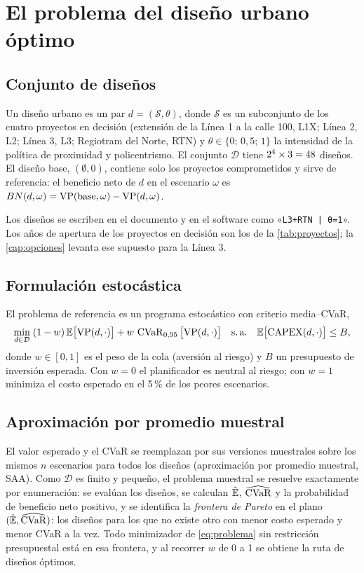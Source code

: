 \chapter{El problema del diseño urbano óptimo}\label{cap:optimizacion}

\section{Conjunto de diseños}

Un diseño urbano es un par $d=(\mathcal S,\theta)$, donde $\mathcal S$ es un subconjunto de los cuatro
proyectos en decisión (extensión de la Línea 1 a la calle 100, L1X; Línea 2, L2; Línea 3, L3;
Regiotram del Norte, RTN) y $\theta\in\{0;\,0{,}5;\,1\}$ la intensidad de la política de proximidad y
policentrismo. El conjunto $\mathcal D$ tiene $2^4\times3=48$ diseños. El diseño base,
$(\emptyset,0)$, contiene solo los proyectos comprometidos y sirve de referencia: el beneficio neto de
$d$ en el escenario $\omega$ es $BN(d,\omega)=\mathrm{VP}(\text{base},\omega)-\mathrm{VP}(d,\omega)$.

Los diseños se escriben en el documento y en el software como «\texttt{L3+RTN | θ=1}». Los años de
apertura de los proyectos en decisión son los de la \cref{tab:proyectos}; la \cref{cap:opciones}
levanta ese supuesto para la Línea 3.

\section{Formulación estocástica}

El problema de referencia es un programa estocástico con criterio media--CVaR,
\begin{equation}\label{eq:problema}
\min_{d\in\mathcal D}\;(1-w)\,\mathbb{E}\big[\mathrm{VP}(d,\cdot)\big]+w\,\operatorname{CVaR}_{0{,}95}\big[\mathrm{VP}(d,\cdot)\big]
\quad\text{s.\,a.}\quad\mathbb{E}\big[\mathrm{CAPEX}(d,\cdot)\big]\le B,
\end{equation}
donde $w\in[0,1]$ es el peso de la cola (aversión al riesgo) y $B$ un presupuesto de inversión
esperada. Con $w=0$ el planificador es neutral al riesgo; con $w=1$ minimiza el costo esperado en el
5\,\% de los peores escenarios.

\section{Aproximación por promedio muestral}

El valor esperado y el CVaR se reemplazan por sus versiones muestrales sobre los mismos $n$ escenarios
para todos los diseños (aproximación por promedio muestral, SAA). Como $\mathcal D$ es finito y pequeño,
el problema muestral se resuelve exactamente por enumeración: se evalúan los \NDisenos{} diseños, se
calculan $\hat{\mathbb{E}}$, $\widehat{\operatorname{CVaR}}$ y la probabilidad de beneficio neto positivo, y se identifica la
\emph{frontera de Pareto} en el plano $(\hat{\mathbb{E}},\widehat{\operatorname{CVaR}})$: los diseños para los que no existe
otro con menor costo esperado y menor CVaR a la vez. Todo minimizador de \eqref{eq:problema} sin
restricción presupuestal está en esa frontera, y al recorrer $w$ de 0 a 1 se obtiene la ruta de diseños
óptimos.

